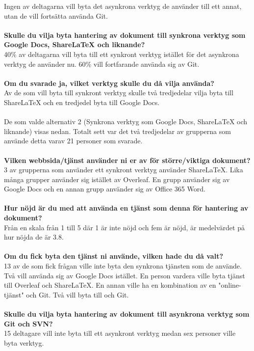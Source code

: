 Ingen av deltagarna vill byta det asynkrona verktyg de använder till ett annat, utan de vill fortsätta använda Git.\\\\
\textbf{Skulle du vilja byta hantering av dokument till synkrona verktyg som Google Docs, ShareLaTeX och liknande?}\\
40\% av deltagarna vill byta till ett synkront verktyg istället för det asynkrona verktyg de använder nu. 60\% vill fortfarande använda sig av Git.\\\\
\textbf{Om du svarade ja, vilket verktyg skulle du då vilja använda?}\\
Av de som vill byta till synkront verktyg skulle två tredjedelar vilja byta till ShareLaTeX och en tredjedel byta till Google Docs.\\\\
De som valde alternativ 2 (Synkrona verktyg som Google Docs, ShareLaTeX och liknande) visas nedan. Totalt sett var det två tredjedelar av grupperna som använde detta varav 21 personer som svarade.\\\\
\textbf{Vilken webbsida/tjänst använder ni er av för större/viktiga dokument?}\\
3 av grupperna som använder ett synkront verktyg använder ShareLaTeX. Lika många grupper använder sig istället av Overleaf. En grupp använder sig av Google Docs och en annan grupp använder sig av Office 365 Word.\\\\
\textbf{Hur nöjd är du med att använda en tjänst som denna för hantering av dokument?}\\
Från en skala från 1 till 5 där 1 är inte nöjd och fem är nöjd, är medelvärdet på hur nöjda de är 3.8.\\\\
\textbf{Om du fick byta den tjänst ni använde, vilken hade du då valt?}\\ 
13 av de som fick frågan ville inte byta den synkrona tjänsten som de använde. Två vill använda sig av Google Docs istället. En person vardera ville byta tjänst till Overleaf och ShareLaTeX. En annan ville ha en kombination av en "online-tjänst" och Git. Två vill byta till \latex och Git.\\\\
\textbf{Skulle du vilja byta hantering av dokument till asynkrona verktyg som Git och SVN?}\\
15 deltagare vill inte byta till ett asynkront verktyg medan sex personer ville byta verktyg.\\\\
